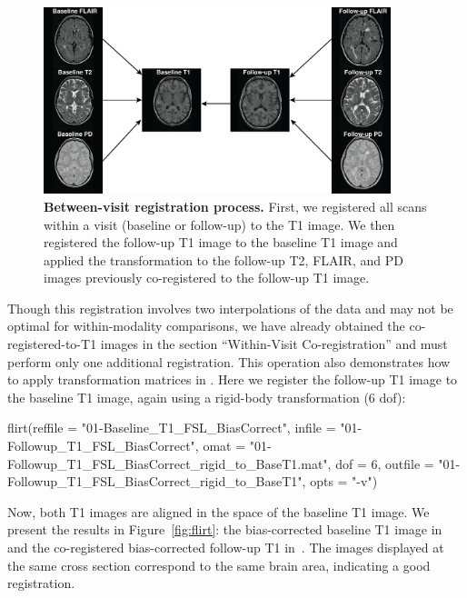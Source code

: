 \begin{figure}
\centering
\includegraphics[width = 0.9\textwidth]{Reg_Figure_Option1.png}
\caption{{\bf Between-visit registration process.}  First, we registered all scans within a visit (baseline or follow-up) to the T1 image.  We then registered the follow-up T1 image to the baseline T1 image and applied the transformation to the follow-up T2, FLAIR, and PD images previously co-registered to the follow-up T1 image. }
\label{fig:reg}
\end{figure}

Though this registration involves two interpolations of the data and may not be optimal for within-modality comparisons, we have already obtained the co-registered-to-T1 images in the section ``Within-Visit Co-registration'' and must perform only one additional registration.  This operation also demonstrates how to apply transformation matrices in .  Here we register the follow-up T1 image to the baseline T1 image, again using a rigid-body transformation (6 dof):

\gobblepars
\begin{Schunk}
\begin{Sinput}
flirt(reffile = "01-Baseline_T1_FSL_BiasCorrect", 
      infile = "01-Followup_T1_FSL_BiasCorrect", 
      omat = "01-Followup_T1_FSL_BiasCorrect_rigid_to_BaseT1.mat", 
      dof = 6,
      outfile = "01-Followup_T1_FSL_BiasCorrect_rigid_to_BaseT1", 
      opts = "-v")
\end{Sinput}
\end{Schunk}
\gobblepars


Now, both T1 images are aligned in the space of the baseline T1 image.  We present the results in Figure~\ref{fig:flirt}: the bias-corrected baseline T1 image in~\protect{} and the co-registered bias-corrected follow-up T1 in~\protect{}.   The images displayed at the same cross section correspond to the same brain area, indicating a good registration.




